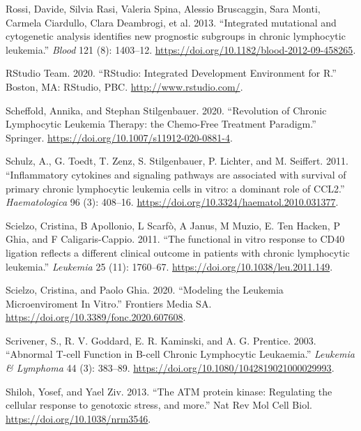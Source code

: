 \documentclass[11pt, a4paper, twosided]{book}
\newenvironment{CSLReferences}%
  {}%
  {\par}
\begin{document}
\begin{CSLReferences}{1}{0}
\leavevmode{}%
Rossi, Davide, Silvia Rasi, Valeria Spina, Alessio Bruscaggin, Sara Monti, Carmela Ciardullo, Clara Deambrogi, et al. 2013. {``{Integrated mutational and cytogenetic analysis identifies new prognostic subgroups in chronic lymphocytic leukemia}.''} \emph{Blood} 121 (8): 1403--12. \url{https://doi.org/10.1182/blood-2012-09-458265}.

\leavevmode{}%
RStudio Team. 2020. {``{RStudio: Integrated Development Environment for R}.''} Boston, MA: RStudio, PBC. \url{http://www.rstudio.com/}.

\leavevmode{}%
Scheffold, Annika, and Stephan Stilgenbauer. 2020. {``{Revolution of Chronic Lymphocytic Leukemia Therapy: the Chemo-Free Treatment Paradigm}.''} Springer. \url{https://doi.org/10.1007/s11912-020-0881-4}.

\leavevmode{}%
Schulz, A., G. Toedt, T. Zenz, S. Stilgenbauer, P. Lichter, and M. Seiffert. 2011. {``{Inflammatory cytokines and signaling pathways are associated with survival of primary chronic lymphocytic leukemia cells in vitro: a dominant role of CCL2}.''} \emph{Haematologica} 96 (3): 408--16. \url{https://doi.org/10.3324/haematol.2010.031377}.

\leavevmode{}%
Scielzo, Cristina, B Apollonio, L Scarfò, A Janus, M Muzio, E. Ten Hacken, P Ghia, and F Caligaris-Cappio. 2011. {``{The functional in vitro response to CD40 ligation reflects a different clinical outcome in patients with chronic lymphocytic leukemia}.''} \emph{Leukemia} 25 (11): 1760--67. \url{https://doi.org/10.1038/leu.2011.149}.

\leavevmode{}%
Scielzo, Cristina, and Paolo Ghia. 2020. {``{Modeling the Leukemia Microenviroment In Vitro}.''} Frontiers Media SA. \url{https://doi.org/10.3389/fonc.2020.607608}.

\leavevmode{}%
Scrivener, S., R. V. Goddard, E. R. Kaminski, and A. G. Prentice. 2003. {``{Abnormal T-cell Function in B-cell Chronic Lymphocytic Leukaemia}.''} \emph{Leukemia \& Lymphoma} 44 (3): 383--89. \url{https://doi.org/10.1080/1042819021000029993}.

\leavevmode{}%
Shiloh, Yosef, and Yael Ziv. 2013. {``{The ATM protein kinase: Regulating the cellular response to genotoxic stress, and more}.''} Nat Rev Mol Cell Biol. \url{https://doi.org/10.1038/nrm3546}.


\end{CSLReferences}
\end{document}
